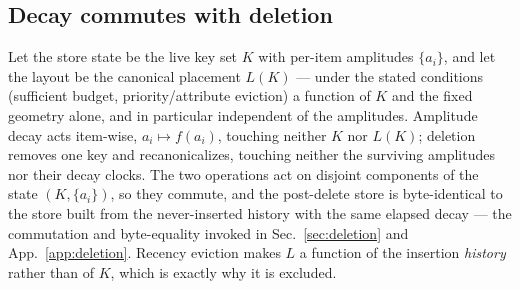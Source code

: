 \documentclass{article}
\begin{document}
\subsection{Decay commutes with deletion}\label{app:deriv:8} Let the store state be the live key set $K$ with per-item amplitudes $\{a_i\}$, and let the layout be the canonical placement $L(K)$ --- under the stated conditions (sufficient budget, priority/attribute eviction) a function of $K$ and the fixed geometry alone, and in particular independent of the amplitudes. Amplitude decay acts item-wise, $a_i\mapsto f(a_i)$, touching neither $K$ nor $L(K)$; deletion removes one key and recanonicalizes, touching neither the surviving amplitudes nor their decay clocks. The two operations act on disjoint components of the state $(K,\{a_i\})$, so they commute, and the post-delete store is byte-identical to the store built from the never-inserted history with the same elapsed decay --- the commutation and byte-equality invoked in Sec.~\ref{sec:deletion} and App.~\ref{app:deletion}. Recency eviction makes $L$ a function of the insertion \emph{history} rather than of $K$, which is exactly why it is excluded.
\end{document}
